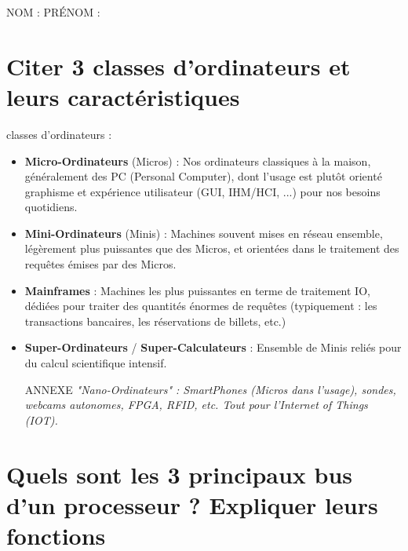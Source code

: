 \documentclass[11pt,a4paper]{article}
\author{Fabrice BOISSIER}
\begin{document}
\setlength{\fboxrule}{2pt}

\noindent {}

\bigskip

NOM : \hspace{6.5cm} PR\'ENOM :

\smallskip

\section{Citer 3 classes d'ordinateurs et leurs caractéristiques}

\bigskip
{} classes d'ordinateurs :
\begin{itemize}
\item \textbf{Micro-Ordinateurs} (Micros) : Nos ordinateurs classiques à la maison, généralement des PC (Personal Computer), dont l'usage est plutôt orienté graphisme et expérience utilisateur (GUI, IHM/HCI, ...) pour nos besoins quotidiens.
\item \textbf{Mini-Ordinateurs} (Minis) : Machines souvent mises en réseau ensemble, légèrement plus puissantes que des Micros, et orientées dans le traitement des requêtes émises par des Micros.
\item \textbf{Mainframes} : Machines les plus puissantes en terme de traitement IO, dédiées pour traiter des quantités énormes de requêtes (typiquement : les transactions bancaires, les réservations de billets, etc.)
\item \textbf{Super-Ordinateurs} / \textbf{Super-Calculateurs} : Ensemble de Minis reliés pour du calcul scientifique intensif.
\item [ANNEXE] \textit{"Nano-Ordinateurs" : SmartPhones (Micros dans l'usage), sondes, webcams autonomes, FPGA, RFID, etc. Tout pour l'Internet of Things (IOT).}\\
\end{itemize}

\section{Quels sont les 3 principaux bus d'un processeur ? Expliquer leurs fonctions}
\end{document}
